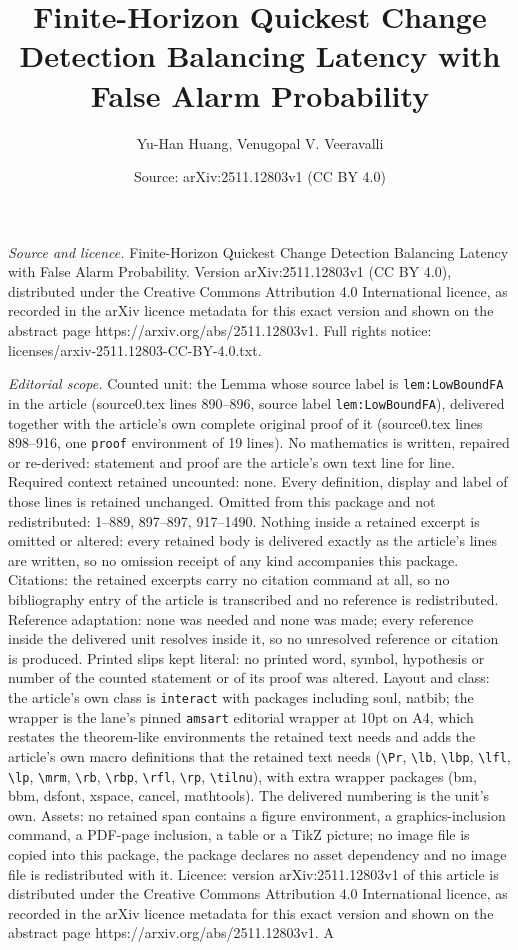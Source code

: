 \documentclass[10pt,a4paper]{amsart}
\title[Finite-Horizon Quickest Change Detection Balancing Latency w]{Finite-Horizon Quickest Change Detection Balancing Latency with False Alarm Probability}
\author{Yu-Han Huang, Venugopal V. Veeravalli}
\date{Source: arXiv:2511.12803v1 (CC BY 4.0)}
\begin{document}
\maketitle

\noindent\emph{Source and licence.} Finite-Horizon Quickest Change Detection Balancing Latency with False Alarm Probability. Version arXiv:2511.12803v1 (CC BY 4.0), distributed under the Creative Commons Attribution 4.0 International licence, as recorded in the arXiv licence metadata for this exact version and shown on the abstract page https://arxiv.org/abs/2511.12803v1. Full rights notice: licenses/arxiv-2511.12803-CC-BY-4.0.txt.\par\smallskip

\noindent\textit{Editorial scope.} Counted unit: the Lemma whose source label is \texttt{lem:LowBoundFA} in the article (source0.tex lines 890--896, source label \texttt{lem:LowBoundFA}), delivered together with the article's own complete original proof of it (source0.tex lines 898--916, one \texttt{proof} environment of 19 lines). No mathematics is written, repaired or re-derived: statement and proof are the article's own text line for line. Required context retained uncounted: none. Every definition, display and label of those lines is retained unchanged. Omitted from this package and not redistributed: 1--889, 897--897, 917--1490. Nothing inside a retained excerpt is omitted or altered: every retained body is delivered exactly as the article's lines are written, so no omission receipt of any kind accompanies this package. Citations: the retained excerpts carry no citation command at all, so no bibliography entry of the article is transcribed and no reference is redistributed. Reference adaptation: none was needed and none was made; every reference inside the delivered unit resolves inside it, so no unresolved reference or citation is produced. Printed slips kept literal: no printed word, symbol, hypothesis or number of the counted statement or of its proof was altered. Layout and class: the article's own class is \texttt{interact} with packages including soul, natbib; the wrapper is the lane's pinned \texttt{amsart} editorial wrapper at 10pt on A4, which restates the theorem-like environments the retained text needs and adds the article's own macro definitions that the retained text needs (\texttt{\textbackslash Pr}, \texttt{\textbackslash lb}, \texttt{\textbackslash lbp}, \texttt{\textbackslash lfl}, \texttt{\textbackslash lp}, \texttt{\textbackslash mrm}, \texttt{\textbackslash rb}, \texttt{\textbackslash rbp}, \texttt{\textbackslash rfl}, \texttt{\textbackslash rp}, \texttt{\textbackslash tilnu}), with extra wrapper packages (bm, bbm, dsfont, xspace, cancel, mathtools). The delivered numbering is the unit's own. Assets: no retained span contains a figure environment, a graphics-inclusion command, a PDF-page inclusion, a table or a TikZ picture; no image file is copied into this package, the package declares no asset dependency and no image file is redistributed with it. Licence: version arXiv:2511.12803v1 of this article is distributed under the Creative Commons Attribution 4.0 International licence, as recorded in the arXiv licence metadata for this exact version and shown on the abstract page https://arxiv.org/abs/2511.12803v1. A 
\end{document}
